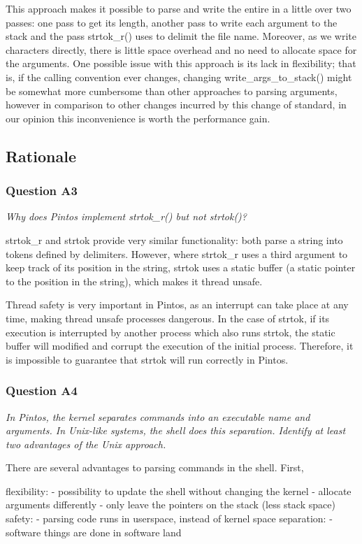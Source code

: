 This approach makes it possible to parse and write the entire in a little over two passes: one pass to get its length, another pass to write each argument to the stack and the pass strtok\_r() uses to delimit the file name.
Moreover, as we write characters directly, there is little space overhead and no need to allocate space for the arguments.
One possible issue with this approach is its lack in flexibility; that is, if the calling convention ever changes, changing write\_args\_to\_stack() might be somewhat more cumbersome than other approaches to parsing arguments, however in comparison to other changes incurred by this change of standard, in our opinion this inconvenience is worth the performance gain.

\subsection{Rationale}
\subsubsection*{Question A3} %
\textit{Why does Pintos implement strtok\_r() but not strtok()?}

strtok\_r and strtok provide very similar functionality: both parse a string into tokens defined by delimiters.
However, where strtok\_r uses a third argument to keep track of its position in the string, strtok uses a static buffer (a static pointer to the position in the string), which makes it thread unsafe.

Thread safety is very important in Pintos, as an interrupt can take place at any time, making thread unsafe processes dangerous. In the case of strtok, if its execution is interrupted by another process which also runs strtok, the static buffer will modified and corrupt the execution of the initial process. Therefore, it is impossible to guarantee that strtok will run correctly in Pintos.

\subsubsection*{Question A4} %
\textit{In Pintos, the kernel separates commands into an executable name and arguments.  In Unix-like systems, the shell does this separation.  Identify at least two advantages of the Unix approach.}

There are several advantages to parsing commands in the shell.
First, 

flexibility:
- possibility to update the shell without changing the kernel
- allocate arguments differently - only leave the pointers on the stack (less stack space)
safety:
- parsing code runs in userspace, instead of kernel space
separation:
- software things are done in software land

